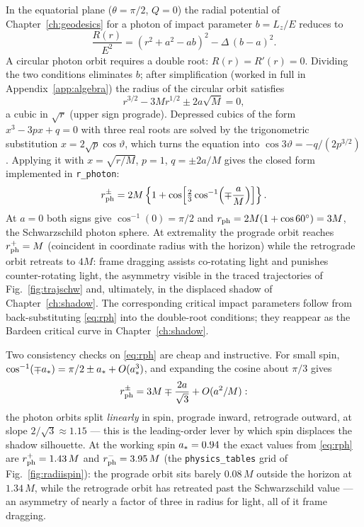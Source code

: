 In the equatorial plane ($\theta = \pi/2$, $Q = 0$) the radial potential
of Chapter~\ref{ch:geodesics} for a photon of impact parameter
$b = L_z/E$ reduces to
\begin{equation}
\frac{R(r)}{E^2} = \left(r^2 + a^2 - a b\right)^2
 - \Delta\,(b - a)^2 .
\label{eq:Req}
\end{equation}
A circular photon orbit requires a double root: $R(r) = R'(r) = 0$.
Dividing the two conditions eliminates $b$; after simplification
(worked in full in Appendix~\ref{app:algebra}) the radius of the
circular orbit satisfies
\begin{equation}
r^{3/2} - 3M r^{1/2} \pm 2a\sqrt{M} = 0,
\label{eq:photoncubic}
\end{equation}
a cubic in $\sqrt{r}$ (upper sign prograde). Depressed cubics of the
form $x^3 - 3px + q = 0$ with three real roots are solved by the
trigonometric substitution $x = 2\sqrt{p}\cos\vartheta$, which turns the
equation into $\cos 3\vartheta = -q/(2p^{3/2})$. Applying it with
$x = \sqrt{r/M}$, $p = 1$, $q = \pm 2a/M$ gives the closed form
implemented in \texttt{r\_photon}:
\begin{equation}
r_{\rm ph}^{\pm} = 2M\left\{1 +
\cos\!\left[\tfrac{2}{3}\cos^{-1}\!\left(\mp\frac{a}{M}\right)\right]
\right\}.
\label{eq:rph}
\end{equation}
At $a = 0$ both signs give $\cos^{-1}(0) = \pi/2$ and
$r_{\rm ph} = 2M(1 + \cos 60^\circ) = 3M$, the Schwarzschild photon
sphere. At extremality the prograde orbit reaches $r_{\rm ph}^+ = M$
(coincident in coordinate radius with the horizon) while the retrograde
orbit retreats to $4M$: frame dragging assists co-rotating light and
punishes counter-rotating light, the asymmetry visible in the traced
trajectories of Fig.~\ref{fig:trajschw} and, ultimately, in the
displaced shadow of Chapter~\ref{ch:shadow}. The corresponding critical
impact parameters follow from back-substituting \eqref{eq:rph} into the
double-root conditions; they reappear as the Bardeen critical curve in
Chapter~\ref{ch:shadow}.

Two consistency checks on \eqref{eq:rph} are cheap and instructive. For
small spin, $\cos^{-1}(\mp a_*) = \pi/2 \pm a_* + O(a_*^3)$,
and expanding the cosine about $\pi/3$ gives
\begin{equation}
r_{\rm ph}^{\pm} = 3M \mp \frac{2a}{\sqrt{3}} + O(a^2/M):
\label{eq:rphexpand}
\end{equation}
the photon orbits split \emph{linearly} in spin, prograde inward,
retrograde outward, at slope $2/\sqrt3 \approx 1.15$ — this is the
leading-order lever by which spin displaces the shadow silhouette. At
the working spin $a_* = 0.94$ the exact values from \eqref{eq:rph}
are $r_{\rm ph}^{+} = 1.43\,M$ and $r_{\rm ph}^{-} = 3.95\,M$ (the
\texttt{physics\_tables} grid of Fig.~\ref{fig:radiispin}): the
prograde orbit sits barely $0.08\,M$ outside the horizon at
$1.34\,M$, while the retrograde orbit has retreated past the
Schwarzschild value — an asymmetry of nearly a factor of three in
radius for light, all of it frame dragging.

